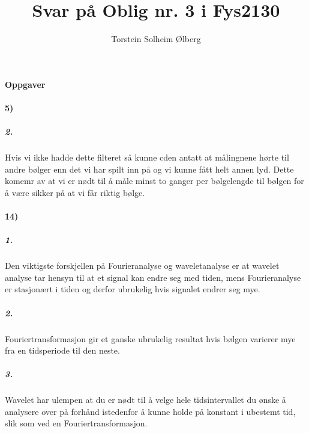 \documentclass[11pt, A4paper,norsk]{article}
\author{Torstein Solheim Ølberg}
\title{Svar på Oblig nr. 3 i Fys2130}
\begin{document}
\maketitle
	\begin{center}
\Large \textbf{Oppgaver}
	\end{center}









		\paragraph{5)}
			\subparagraph{2.}
				\begin{flushleft}
Hvis vi ikke hadde dette filteret så kunne cden antatt at målingnene hørte til andre bølger enn det vi har spilt inn på og vi kunne fått helt annen lyd. Dette komemr av at vi er nødt til å måle minst to ganger per bølgelengde til bølgen for å være sikker på at vi får riktig bølge.
				\end{flushleft}









		\paragraph{14)}
			\subparagraph{1.}
				\begin{flushleft}
Den viktigste forskjellen på Fourieranalyse og waveletanalyse er at wavelet analyse tar hensyn til at et signal kan endre seg med tiden, mens Fourieranalyse er stasjonært i tiden og derfor ubrukelig hvis signalet endrer seg mye.
				\end{flushleft}









			\subparagraph{2.}
				\begin{flushleft}
Fouriertransformasjon gir et ganske ubrukelig resultat hvis bølgen varierer mye fra en tidsperiode til den neste.
				\end{flushleft}
			









			\subparagraph{3.}
				\begin{flushleft}
Wavelet har ulempen at du er nødt til å velge hele tidsintervallet du ønske å analysere over på forhånd istedenfor å kunne holde på konstant i ubestemt tid, slik som ved en Fouriertransformasjon.
				\end{flushleft}
\end{document}

